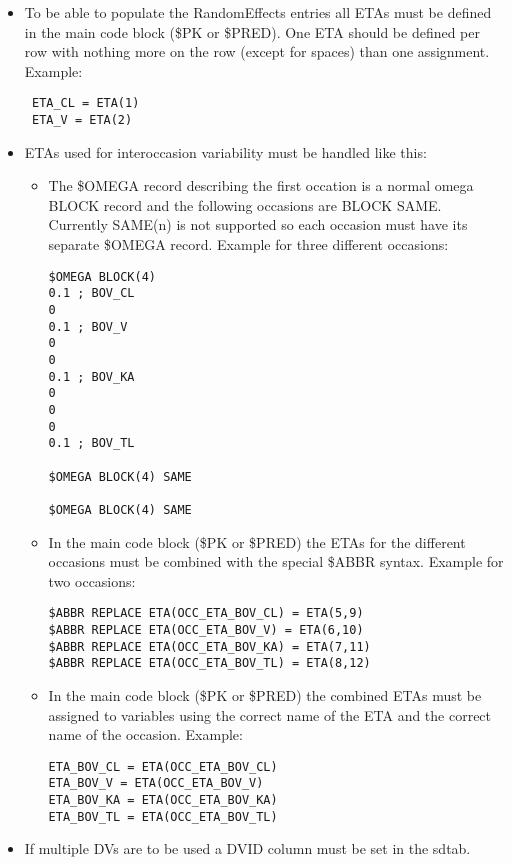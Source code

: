 \begin{itemize}
\begin{verbatim}
        \end{verbatim}
    \item To be able to populate the RandomEffects entries all ETAs must be defined in the main code block (\$PK or \$PRED). One ETA should be defined per row with nothing more on the row (except for spaces) than one assignment. Example:
        \begin{verbatim}
 ETA_CL = ETA(1)
 ETA_V = ETA(2)
        \end{verbatim}
    \item ETAs used for interoccasion variability must be handled like this:
        \begin{itemize}
            \item The \$OMEGA record describing the first occation is a normal omega BLOCK record and the following occasions are BLOCK SAME. Currently SAME(n) is not supported so each occasion must have its separate \$OMEGA record. Example for three different occasions:
            \begin{verbatim}
$OMEGA BLOCK(4)
0.1 ; BOV_CL
0
0.1 ; BOV_V
0
0
0.1 ; BOV_KA
0
0
0
0.1 ; BOV_TL

$OMEGA BLOCK(4) SAME

$OMEGA BLOCK(4) SAME
            \end{verbatim}
            \item In the main code block (\$PK or \$PRED) the ETAs for the different occasions must be combined with the special \$ABBR syntax. Example for two occasions:
            \begin{verbatim}
$ABBR REPLACE ETA(OCC_ETA_BOV_CL) = ETA(5,9)
$ABBR REPLACE ETA(OCC_ETA_BOV_V) = ETA(6,10)
$ABBR REPLACE ETA(OCC_ETA_BOV_KA) = ETA(7,11)
$ABBR REPLACE ETA(OCC_ETA_BOV_TL) = ETA(8,12)
            \end{verbatim}
        \item In the main code block (\$PK or \$PRED) the combined ETAs must be assigned to variables using the correct name of the ETA and the correct name of the occasion. Example:
            \begin{verbatim}
ETA_BOV_CL = ETA(OCC_ETA_BOV_CL)
ETA_BOV_V = ETA(OCC_ETA_BOV_V)
ETA_BOV_KA = ETA(OCC_ETA_BOV_KA)
ETA_BOV_TL = ETA(OCC_ETA_BOV_TL)
            \end{verbatim}
        \end{itemize}
    \item If multiple DVs are to be used a DVID column must be set in the sdtab.
\end{itemize}


